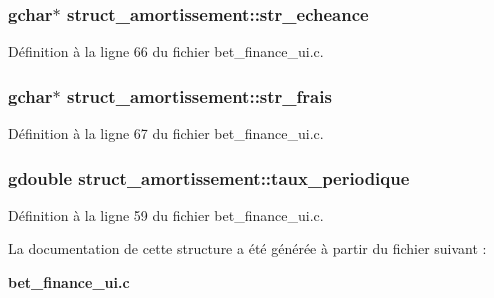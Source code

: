 \subsubsection[{str\_\-echeance}]{\setlength{\rightskip}{0pt plus 5cm}gchar$\ast$ {\bf struct\_\-amortissement::str\_\-echeance}}\label{structstruct__amortissement_a8310ee3229cc4678c2a4aa94ee9ff45a}


Définition à la ligne 66 du fichier bet\_\-finance\_\-ui.c.

\subsubsection[{str\_\-frais}]{\setlength{\rightskip}{0pt plus 5cm}gchar$\ast$ {\bf struct\_\-amortissement::str\_\-frais}}\label{structstruct__amortissement_af2220fca1ef3c9be467e91e857fe2cb5}


Définition à la ligne 67 du fichier bet\_\-finance\_\-ui.c.

\subsubsection[{taux\_\-periodique}]{\setlength{\rightskip}{0pt plus 5cm}gdouble {\bf struct\_\-amortissement::taux\_\-periodique}}\label{structstruct__amortissement_a22c407201d615cab1eeb5ff306e9ed66}


Définition à la ligne 59 du fichier bet\_\-finance\_\-ui.c.



La documentation de cette structure a été générée à partir du fichier suivant :\begin{DoxyCompactItemize}
\item 
{\bf bet\_\-finance\_\-ui.c}\end{DoxyCompactItemize}
